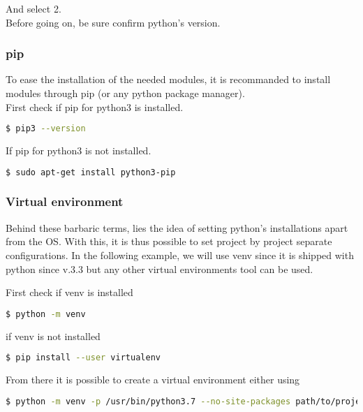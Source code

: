 And select 2.\\

Before going on, be sure confirm python's version.\\

\subsubsection{pip}

To ease the installation of the needed modules, it is recommanded to install modules through pip (or any python package manager).\\

First check if pip for python3 is installed.

\begin{lstlisting}[language=bash]
  $ pip3 --version
\end{lstlisting}

If pip for python3 is not installed.

\begin{lstlisting}[language=bash]
  $ sudo apt-get install python3-pip
\end{lstlisting}

\subsubsection{Virtual environment}

Behind these barbaric terms, lies the idea of setting python's installations apart from the OS. With this, it is thus possible to set project by project separate configurations. In the following example, we will use venv since it is shipped with python since v.3.3 but any other virtual environments tool can be used.

First check if venv is installed

\begin{lstlisting}[language=bash]
  $ python -m venv
\end{lstlisting}

if venv is not installed

\begin{lstlisting}[language=bash]
  $ pip install --user virtualenv
\end{lstlisting}

From there it is possible to create a virtual environment either using

\begin{lstlisting}[language=bash]
  $ python -m venv -p /usr/bin/python3.7 --no-site-packages path/to/project/project_name
\end{lstlisting}

